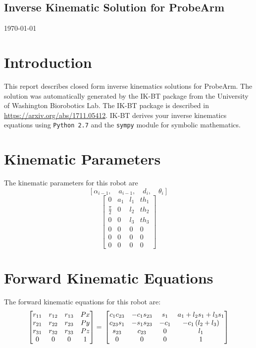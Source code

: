 
    \begin{center}
    \section*{Inverse Kinematic Solution for ProbeArm}
    \today
    \end{center}
    \section{Introduction}
    This report describes closed form inverse kinematics solutions for ProbeArm.
    The solution was automatically generated by the IK-BT package from the University of Washington Biorobotics Lab.
    The IK-BT package is described in
    \url{https://arxiv.org/abs/1711.05412}.  IK-BT derives your inverse kinematics equations
    using {\tt Python 2.7} and the {\tt sympy} module for symbolic mathematics.
    
\section{Kinematic Parameters}
    The kinematic parameters for this robot are
    \[ \left [ \alpha_{i-1}, \quad a_{i-1}, \quad d_i, \quad \theta_i \right  ] \]
    \begin{dmath} \left[\begin{matrix}0 & a_{1} & l_{1} & th_{1}\\\frac{\pi}{2} & 0 & l_{2} & th_{2}\\0 & 0 & l_{3} & th_{3}\\0 & 0 & 0 & 0\\0 & 0 & 0 & 0\\0 & 0 & 0 & 0\end{matrix}\right] \end{dmath}
    
\section{Forward Kinematic Equations}
    The forward kinematic equations for this robot are:
\begin{dmath}
\left[\begin{matrix}r_{11} & r_{12} & r_{13} & Px\\r_{21} & r_{22} & r_{23} & Py\\r_{31} & r_{32} & r_{33} & Pz\\0 & 0 & 0 & 1\end{matrix}\right] =  \\
\left[\begin{matrix}c_{1} c_{23} & - c_{1} s_{23} & s_{1} & a_{1} + l_{2} s_{1} + l_{3} s_{1}\\c_{23} s_{1} & - s_{1} s_{23} & - c_{1} & - c_{1} \left(l_{2} + l_{3}\right)\\s_{23} & c_{23} & 0 & l_{1}\\0 & 0 & 0 & 1\end{matrix}\right]
\end{dmath}

